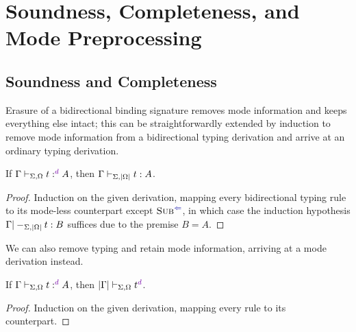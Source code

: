 
\section{Soundness, Completeness, and Mode Preprocessing}\label{sec:pre-synthesis}


\subsection{Soundness and Completeness}
\label{sec:soundness-and-completeness}


Erasure of a bidirectional binding signature removes mode information and keeps everything else intact; this can be straightforwardly extended by induction to remove mode information from a bidirectional typing derivation and arrive at an ordinary typing derivation.

\begin{lemma}[Soundness]\label{thm:soundness}
If\/ $\Gamma \vdash_{\Sigma, \Omega} t :^\dir{d} A$, then $\Gamma \vdash_{\Sigma, \left|\Omega\right|} t : A$.
\end{lemma}

\begin{proof}
Induction on the given derivation, mapping every bidirectional typing rule to its mode-less counterpart except $\ChkRule{Sub}$, in which case the induction hypothesis $\Gamma |-_{\Sigma,\left|\Omega\right|} t : B$ suffices due to the premise $B = A$.
\end{proof}

We can also remove typing and retain mode information, arriving at a mode derivation instead.

\begin{proposition}\label{thm:typing-removal}
If\/ $\Gamma \vdash_{\Sigma, \Omega} t :^\dir{d} A$, then $\erase\Gamma \vdash_{\Sigma, \Omega} t^\dir{d}$.
\end{proposition}

\begin{proof}
Induction on the given derivation, mapping every rule to its counterpart.
\end{proof}

